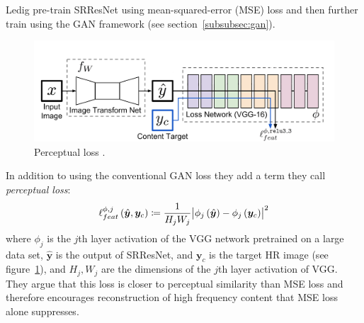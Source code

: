 Ledig \etal pre-train SRResNet using mean-squared-error (MSE) loss and then further train using the GAN framework (see section~\ref{subsubsec:gan}).
%
\begin{figure}
    \centering
    \begin{adjustbox}{width=\linewidth}
        \centering
        \includegraphics[]{figures/neural_networks/perceptual_loss.png}
    \end{adjustbox}
    \caption{Perceptual loss \cite{johnson2016perceptual}.}\label{fig:perceptualloss}
\end{figure}
In addition to using the conventional GAN loss they add a term they call \textit{perceptual loss}:
\begin{equation}
    \ell_{feat}^{\phi, j} \left( \hat{\bm{y}}, \bm{y}_c\right) \coloneqq \frac{1}{H_j W_j} \abs{\phi_j\left({\hat{\bm{y}}}\right) - \phi_j \left(\bm{y}_c\right)}^2
\end{equation}
where \(\phi_j\) is the \(j\)th layer activation of the VGG network \cite{simonyan2014very} pretrained on a large data set, \(\hat{\bm{y}}\) is the output of SRResNet, and \(\bm{y}_c\) is the target HR image (see figure~\ref{fig:perceptualloss}), and \(H_j, W_j\) are the dimensions of the \(j\)th layer activation of VGG.
%
They argue that this loss is closer to perceptual similarity than MSE loss and therefore encourages reconstruction of high frequency content that MSE loss alone suppresses.
